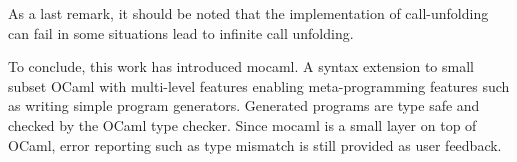 As a last remark, it should be noted that the implementation of call-unfolding can fail in some situations lead to infinite call unfolding. 


To conclude, this work has introduced mocaml. A syntax extension to small subset OCaml with multi-level features enabling meta-programming features such as writing simple program generators. Generated programs are type safe and checked by the OCaml type checker. Since mocaml is a small layer on top of OCaml, error reporting such as type mismatch is still provided as user feedback.

